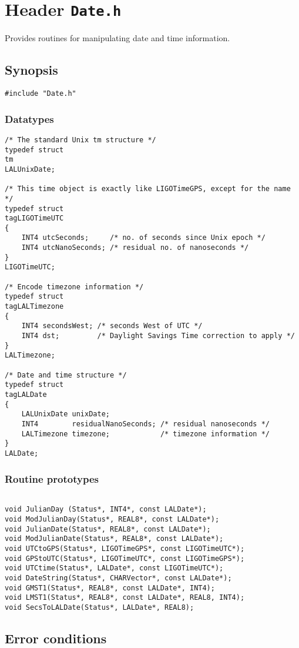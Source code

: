 
\section{Header \texttt{Date.h}}
\label{sec:dateh:header}
Provides routines for manipulating date and time information.

\subsection{Synopsis}
\label{sec:dateh:synopsis}
\begin{verbatim}
#include "Date.h"
\end{verbatim}

\subsubsection{Datatypes}
\label{sec:dateh:datatypes}
\begin{verbatim}
/* The standard Unix tm structure */
typedef struct
tm
LALUnixDate;

/* This time object is exactly like LIGOTimeGPS, except for the name */
typedef struct
tagLIGOTimeUTC
{
    INT4 utcSeconds;     /* no. of seconds since Unix epoch */
    INT4 utcNanoSeconds; /* residual no. of nanoseconds */
}
LIGOTimeUTC;

/* Encode timezone information */
typedef struct
tagLALTimezone
{
    INT4 secondsWest; /* seconds West of UTC */
    INT4 dst;         /* Daylight Savings Time correction to apply */
}
LALTimezone;    

/* Date and time structure */
typedef struct
tagLALDate
{
    LALUnixDate unixDate;
    INT4        residualNanoSeconds; /* residual nanoseconds */
    LALTimezone timezone;            /* timezone information */
}
LALDate;
\end{verbatim}

\subsubsection{Routine prototypes}
\begin{verbatim}

void JulianDay (Status*, INT4*, const LALDate*);
void ModJulianDay(Status*, REAL8*, const LALDate*);
void JulianDate(Status*, REAL8*, const LALDate*);
void ModJulianDate(Status*, REAL8*, const LALDate*);
void UTCtoGPS(Status*, LIGOTimeGPS*, const LIGOTimeUTC*);
void GPStoUTC(Status*, LIGOTimeUTC*, const LIGOTimeGPS*);
void UTCtime(Status*, LALDate*, const LIGOTimeUTC*);
void DateString(Status*, CHARVector*, const LALDate*);
void GMST1(Status*, REAL8*, const LALDate*, INT4);
void LMST1(Status*, REAL8*, const LALDate*, REAL8, INT4);
void SecsToLALDate(Status*, LALDate*, REAL8);

\end{verbatim}



\subsection{Error conditions}

